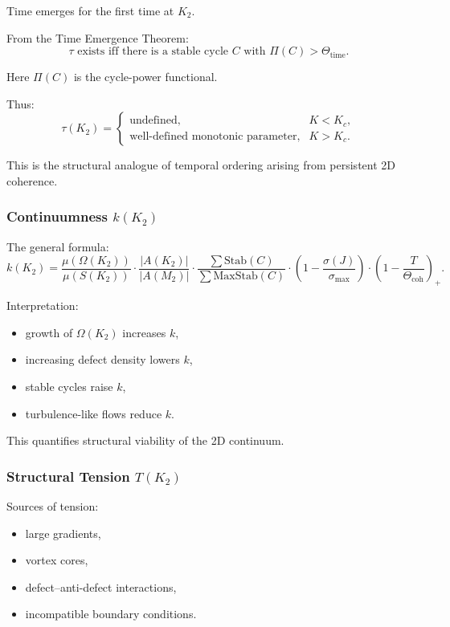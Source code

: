 Time emerges for the first time at $K_2$.

From the Time Emergence Theorem:
\[
\tau \text{ exists iff there is a stable cycle }
C \text{ with } \Pi(C) > \Theta_{\mathrm{time}}.
\]

Here $\Pi(C)$ is the cycle-power functional.

Thus:
\[
\tau(K_2) =
\begin{cases}
\text{undefined}, & K < K_c, \\
\text{well-defined monotonic parameter}, & K > K_c.
\end{cases}
\]

This is the structural analogue of temporal ordering arising from
persistent 2D coherence.

\subsubsection{Continuumness \texorpdfstring{$k(K_2)$}{k(K_2)}}

The general formula:
\[
k(K_2) =
\frac{\mu(\Omega(K_2))}{\mu(S(K_2))}
\cdot
\frac{|A(K_2)|}{|A(M_2)|}
\cdot
\frac{\sum \mathrm{Stab}(C)}{\sum \mathrm{MaxStab}(C)}
\cdot
\left(1 - \frac{\sigma(J)}{\sigma_{\max}}\right)
\cdot
\left(1 - \frac{T}{\Theta_{\mathrm{coh}}}\right)_+.
\]

Interpretation:
\begin{itemize}
    \item growth of $\Omega(K_2)$ increases $k$,
    \item increasing defect density lowers $k$,
    \item stable cycles raise $k$,
    \item turbulence-like flows reduce $k$.
\end{itemize}

This quantifies structural viability of the 2D continuum.

\subsubsection{Structural Tension \texorpdfstring{$T(K_2)$}{T(K_2)}}

Sources of tension:
\begin{itemize}
    \item large gradients,
    \item vortex cores,
    \item defect–anti-defect interactions,
    \item incompatible boundary conditions.
\end{itemize}

